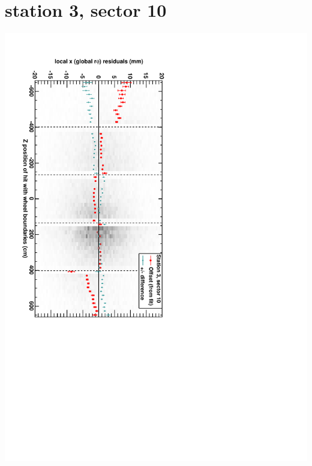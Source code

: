 \documentclass[compress]{beamer}
\begin{document}
\section*{station 3, sector 10}
\begin{frame} \vfill \mbox{\hspace{-1 cm}\includegraphics[height=1.2\linewidth, angle=90]{DTrphiVsZ_st3_sr10.pdf}} \end{frame}
\end{document}
